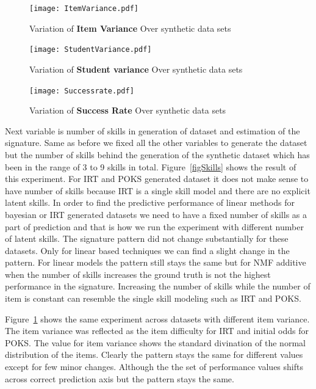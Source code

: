 \begin{figure}
  \centering
    \texttt{[image: ItemVariance.pdf]}
\caption{Variation of \textbf{Item Variance} Over synthetic data sets}
\label{figitemVar}
\end{figure}

\begin{figure}
  \centering
    \texttt{[image: StudentVariance.pdf]}
\caption{Variation of \textbf{Student variance} Over synthetic data sets}
\label{figStudentVar}
\end{figure}


\begin{figure}
  \centering
    \texttt{[image: Successrate.pdf]}
\caption{Variation of \textbf{Success Rate} Over synthetic data sets}
\label{figSucceessRate}
\end{figure}


Next variable is number of skills in generation of dataset and estimation of the signature. Same as before we fixed all the other variables to generate the dataset but the number of skills behind the generation of the synthetic dataset which has been in the range of 3 to 9 skills in total. Figure~\ref{figSkills} shows the result of this experiment. For IRT and POKS generated dataset it does not make sense to have number of skills because IRT is a single skill model and there are no explicit latent skills. In order to find the predictive performance of linear methods for bayesian or IRT generated datasets we need to have a fixed number of skills as a part of prediction and that is how we run the experiment with different number of latent skills. The signature pattern did not change substantially for these datasets. Only for linear based techniques we can find a slight change in the pattern. For linear models the pattern still stays the same but for NMF additive when the number of skills increases the ground truth is not the highest performance in the signature. Increasing the number of skills while the number of item is constant can resemble the single skill modeling such as IRT and POKS. 

Figure~\ref{figitemVar} shows the same experiment across datasets with different item variance. The item variance was reflected as the item difficulty for IRT and initial odds for POKS. The value for item variance shows the standard divination of the normal distribution of the items. Clearly the pattern stays the same for different values except for few minor changes. Although the the set of performance values shifts across correct prediction axis but the pattern stays the same.

